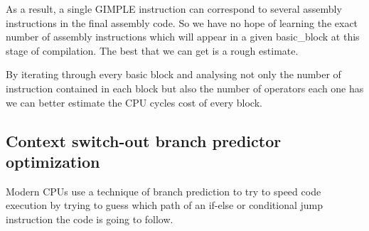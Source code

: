 \documentclass[12pt,a4paper]{report}
\begin{document}
As a result, a single GIMPLE instruction can correspond to several assembly instructions in the final assembly code. So we have no hope of learning the exact number of assembly instructions which will appear in a given basic\_block at this stage of compilation. The best that we can get is a rough estimate.

By iterating through every basic block and analysing not only the number of instruction contained in each block but also the number of operators each one has we can better estimate the CPU cycles cost of every block.








\subsection{Context switch-out branch predictor optimization} \label{bpo}
Modern CPUs use a technique of branch prediction to try to speed code execution \cite{bpo} by trying to guess which path of an if-else or conditional jump instruction the code is going to follow. 
\end{document}
